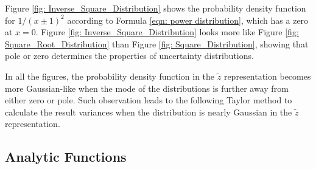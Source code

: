 \documentclass[twoside]{article}
\numberwithin{equation}{section}
\begin{document}
Figure \ref{fig: Inverse_Square_Distribution} shows the probability density function for $1/(x \pm 1)^2$ according to Formula \eqref{eqn: power distribution}, which has a zero at $x=0$.
Figure \ref{fig: Inverse_Square_Distribution} looks more like Figure \ref{fig: Square_Root_Distribution} than Figure \ref{fig: Square_Distribution}, showing that pole or zero determines the properties of uncertainty distributions.

In all the figures, the probability density function in the $\tilde{z}$ representation becomes more Gaussian-like when the mode of the distributions is further away from either zero or pole.
Such observation leads to the following Taylor method to calculate the result variances when the distribution is nearly Gaussian in the $\tilde{z}$ representation.
 



\subsection{Analytic Functions}

\iffalse
\end{document}
